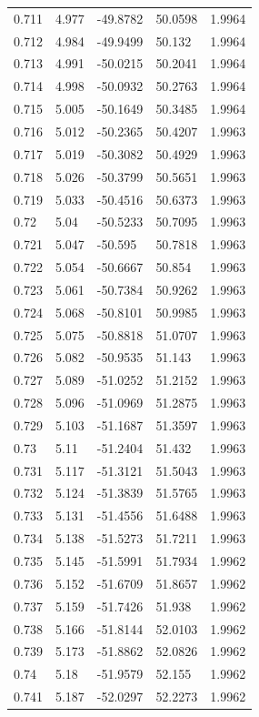 \begin{tabular}{lllll}
0.711 & 4.977 & -49.8782 & 50.0598 & 1.9964 \\
0.712 & 4.984 & -49.9499 & 50.132 & 1.9964 \\
0.713 & 4.991 & -50.0215 & 50.2041 & 1.9964 \\
0.714 & 4.998 & -50.0932 & 50.2763 & 1.9964 \\
0.715 & 5.005 & -50.1649 & 50.3485 & 1.9964 \\
0.716 & 5.012 & -50.2365 & 50.4207 & 1.9963 \\
0.717 & 5.019 & -50.3082 & 50.4929 & 1.9963 \\
0.718 & 5.026 & -50.3799 & 50.5651 & 1.9963 \\
0.719 & 5.033 & -50.4516 & 50.6373 & 1.9963 \\
0.72 & 5.04 & -50.5233 & 50.7095 & 1.9963 \\
0.721 & 5.047 & -50.595 & 50.7818 & 1.9963 \\
0.722 & 5.054 & -50.6667 & 50.854 & 1.9963 \\
0.723 & 5.061 & -50.7384 & 50.9262 & 1.9963 \\
0.724 & 5.068 & -50.8101 & 50.9985 & 1.9963 \\
0.725 & 5.075 & -50.8818 & 51.0707 & 1.9963 \\
0.726 & 5.082 & -50.9535 & 51.143 & 1.9963 \\
0.727 & 5.089 & -51.0252 & 51.2152 & 1.9963 \\
0.728 & 5.096 & -51.0969 & 51.2875 & 1.9963 \\
0.729 & 5.103 & -51.1687 & 51.3597 & 1.9963 \\
0.73 & 5.11 & -51.2404 & 51.432 & 1.9963 \\
0.731 & 5.117 & -51.3121 & 51.5043 & 1.9963 \\
0.732 & 5.124 & -51.3839 & 51.5765 & 1.9963 \\
0.733 & 5.131 & -51.4556 & 51.6488 & 1.9963 \\
0.734 & 5.138 & -51.5273 & 51.7211 & 1.9963 \\
0.735 & 5.145 & -51.5991 & 51.7934 & 1.9962 \\
0.736 & 5.152 & -51.6709 & 51.8657 & 1.9962 \\
0.737 & 5.159 & -51.7426 & 51.938 & 1.9962 \\
0.738 & 5.166 & -51.8144 & 52.0103 & 1.9962 \\
0.739 & 5.173 & -51.8862 & 52.0826 & 1.9962 \\
0.74 & 5.18 & -51.9579 & 52.155 & 1.9962 \\
0.741 & 5.187 & -52.0297 & 52.2273 & 1.9962 \\

\end{tabular}
